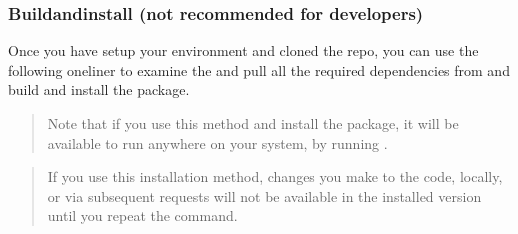 \documentclass[letterpaper,10pt,english,openany,oneside]{sphinxmanual}
\begin{document}
\subsubsection{Build\sphinxhyphen{}and\sphinxhyphen{}install (not recommended for developers)}
\label{\detokenize{docs/guide-chapter-contributing:build-and-install-not-recommended-for-developers}}
\sphinxAtStartPar
Once you have setup your environment and cloned the repo, you can use
the following one\sphinxhyphen{}liner to examine the  and pull all the
required dependencies from  and build and install the
package.
\begin{quote}

\sphinxAtStartPar
Note that if you use this method and install the package, it will be
available to run anywhere on your system, by running .
\end{quote}
\begin{quote}

\sphinxAtStartPar
If you use this installation method, changes you make to the code,
locally, or via subsequent  requests will not be
available in the installed version until you repeat the
 command.
\end{quote}
\end{document}
